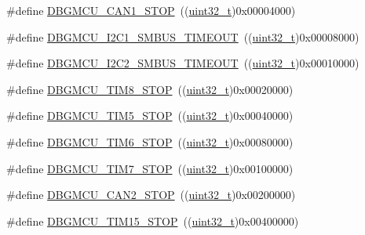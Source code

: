 \begin{DoxyCompactItemize}
\item 
\#define \hyperlink{group___d_b_g_m_c_u___exported___constants_ga5ef70e050d1a95f350b6585336a55ca8}{D\+B\+G\+M\+C\+U\+\_\+\+C\+A\+N1\+\_\+\+S\+T\+OP}~((\hyperlink{_p_e___types_8h_a33594304e786b158f3fb30289278f5af}{uint32\+\_\+t})0x00004000)
\item 
\#define \hyperlink{group___d_b_g_m_c_u___exported___constants_ga1c0566af96833376cf1af98449cc914b}{D\+B\+G\+M\+C\+U\+\_\+\+I2\+C1\+\_\+\+S\+M\+B\+U\+S\+\_\+\+T\+I\+M\+E\+O\+UT}~((\hyperlink{_p_e___types_8h_a33594304e786b158f3fb30289278f5af}{uint32\+\_\+t})0x00008000)
\item 
\#define \hyperlink{group___d_b_g_m_c_u___exported___constants_ga316f8eba36b7a796dd3c6b7d6640b4bf}{D\+B\+G\+M\+C\+U\+\_\+\+I2\+C2\+\_\+\+S\+M\+B\+U\+S\+\_\+\+T\+I\+M\+E\+O\+UT}~((\hyperlink{_p_e___types_8h_a33594304e786b158f3fb30289278f5af}{uint32\+\_\+t})0x00010000)
\item 
\#define \hyperlink{group___d_b_g_m_c_u___exported___constants_gaa66feea7d5f2c253fe3f431f9dd4bd1e}{D\+B\+G\+M\+C\+U\+\_\+\+T\+I\+M8\+\_\+\+S\+T\+OP}~((\hyperlink{_p_e___types_8h_a33594304e786b158f3fb30289278f5af}{uint32\+\_\+t})0x00020000)
\item 
\#define \hyperlink{group___d_b_g_m_c_u___exported___constants_gaf97e21534b3aa9482af496497a37ff4b}{D\+B\+G\+M\+C\+U\+\_\+\+T\+I\+M5\+\_\+\+S\+T\+OP}~((\hyperlink{_p_e___types_8h_a33594304e786b158f3fb30289278f5af}{uint32\+\_\+t})0x00040000)
\item 
\#define \hyperlink{group___d_b_g_m_c_u___exported___constants_ga076cf7d18c7019e99f5f15962ab317eb}{D\+B\+G\+M\+C\+U\+\_\+\+T\+I\+M6\+\_\+\+S\+T\+OP}~((\hyperlink{_p_e___types_8h_a33594304e786b158f3fb30289278f5af}{uint32\+\_\+t})0x00080000)
\item 
\#define \hyperlink{group___d_b_g_m_c_u___exported___constants_gaf593ca16ee6d3f1fabc549878f3f87f0}{D\+B\+G\+M\+C\+U\+\_\+\+T\+I\+M7\+\_\+\+S\+T\+OP}~((\hyperlink{_p_e___types_8h_a33594304e786b158f3fb30289278f5af}{uint32\+\_\+t})0x00100000)
\item 
\#define \hyperlink{group___d_b_g_m_c_u___exported___constants_gace53677f1b7b9a52b592cf2b0f3f7178}{D\+B\+G\+M\+C\+U\+\_\+\+C\+A\+N2\+\_\+\+S\+T\+OP}~((\hyperlink{_p_e___types_8h_a33594304e786b158f3fb30289278f5af}{uint32\+\_\+t})0x00200000)
\item 
\#define \hyperlink{group___d_b_g_m_c_u___exported___constants_ga68f2b4e7feb0a1f1e4b437a104c30f03}{D\+B\+G\+M\+C\+U\+\_\+\+T\+I\+M15\+\_\+\+S\+T\+OP}~((\hyperlink{_p_e___types_8h_a33594304e786b158f3fb30289278f5af}{uint32\+\_\+t})0x00400000)

\end{DoxyCompactItemize}
